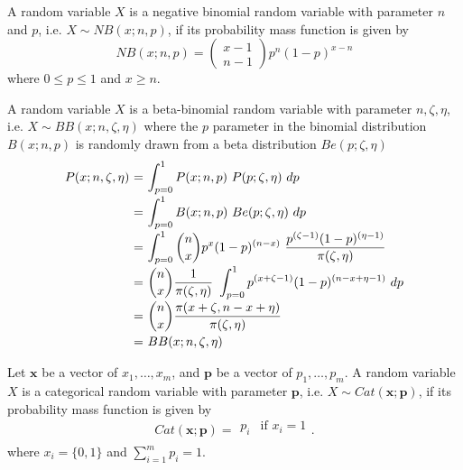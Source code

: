 \begin{definition2}
	A random variable $X$ is a negative binomial random variable with parameter $n$ and $p$, i.e. $X \sim NB(x ; n, p)$, if its probability mass function is given by
	\[
	NB(x ; n, p) = \begin{pmatrix} x - 1 \\ n - 1 \end{pmatrix} p^n (1 - p)^{x-n}
	\]
	\noindent where $0 \leq p \leq 1$ and $x \geq n$.
\end{definition2}

\begin{definition2}
	A random variable $X$ is a beta-binomial random variable with parameter $n, \zeta, \eta$, i.e. $X \sim BB(x ; n, \zeta, \eta)$ where the $p$ parameter in the binomial distribution $B(x ; n, p)$ is randomly drawn from a beta distribution $Be(p ; \zeta, \eta)$ 
	\begin{equation*}
	\begin{tabular}{r@{ = }l}
	$P(x ; n, \zeta, \eta)$ & $\displaystyle\int_{p=0}^{1} P(x ; n, p) ~ P(p ; \zeta, \eta) ~dp$ \\ [2ex]
	& $\displaystyle\int_{p=0}^{1} B(x ; n, p) ~ Be(p ; \zeta, \eta) ~dp$ \\ [2ex]
	& $\displaystyle\int_{p=0}^{1} \binom{n}{x} p^x (1-p)^{(n-x)} ~ \displaystyle\frac{p^{(\zeta - 1)} (1-p)^{(\eta-1)}}{\pi(\zeta, \eta)}$ \\ [2ex]
	& $\displaystyle\binom nx \displaystyle\frac{1}{\pi(\zeta, \eta)} ~ \displaystyle\int_{p=0}^{1} p^{(x+\zeta-1)} (1-p)^{(n-x+\eta-1)} ~dp$ \\ [2ex]
	& $\displaystyle\binom nx \displaystyle\frac{\pi(x+\zeta, n-x+\eta)}{\pi(\zeta, \eta)}$ \\ [2ex]
	& $BB(x ; n, \zeta, \eta)$
	\end{tabular}
	\end{equation*}
\end{definition2}

\begin{definition2}
	Let $\mathbf{x}$ be a vector of $x_1, \ldots, x_m$, and $\mathbf p$ be a vector of $p_1, \ldots, p_m$. A random variable $X$ is a categorical random variable with parameter $\mathbf p$, i.e. $X \sim Cat(\mathbf x ; \mathbf p)$, if its probability mass function is given by
	\[
	Cat(\mathbf x ; \mathbf p) = \begin{matrix}
	p_i & \textrm{if } x_i = 1 \\
	\end{matrix}.
	\]
	\noindent where $x_i = \{0, 1\}$ and $\displaystyle\sum_{i=1}^{m} p_i = 1$.
\end{definition2}

